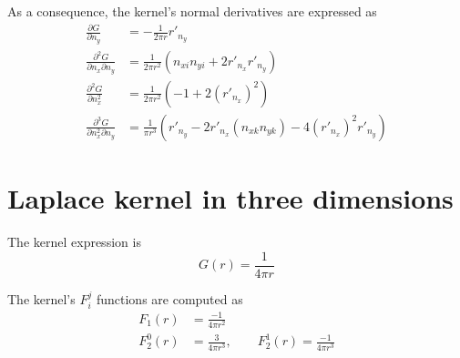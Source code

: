 As a consequence, the kernel's normal derivatives are expressed as
%
\begin{align}
	\frac{\partial G}{\partial n_y} 
	&= -\frac{1}{2\pi r} r'_{n_y}
	\\
	\frac{\partial^2 G}{\partial n_x \partial n_y}
	&= \frac{1}{2\pi r^2}\left( n_{xi} n_{yi} + 2 r'_{n_x} r'_{n_y}\right)
	\\
	\frac{\partial^2 G}{\partial n_x^2}
	&= \frac{1}{2\pi r^2}\left( -1 + 2 \left(r'_{n_x}\right)^2 \right)
	\\
	\frac{\partial^3 G}{\partial n_x^2 \partial n_y}
	&= \frac{1}{\pi r^3} 
	 \left(
	r'_{n_y}
	- 2 r'_{n_x} \left(n_{xk} n_{yk}\right)
	-4 \left(r'_{n_x}\right)^2 r'_{n_y}
	\right)
\end{align}


\section{Laplace kernel in three dimensions}

The kernel expression is
%
\begin{equation}
	G(r) = \frac{1}{4\pi r}
\end{equation}
%

The kernel's $F_i^j$ functions are computed as
%
\begin{align}
	F_1(r) &= \frac{-1}{4\pi r^2} \\
	F_2^0(r) &= \frac{3}{4\pi r^3}, \qquad F_2^1(r) = \frac{-1}{4\pi r^3}
\end{align}

